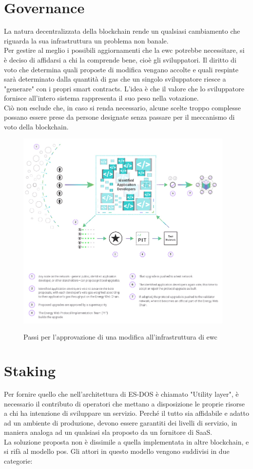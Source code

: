 \documentclass[12pt, letterpaper, twoside]{article}
\begin{document}
\newpage

\section{Governance}
La natura decentralizzata della blockchain rende un qualsiasi cambiamento che riguarda la sua infrastruttura un problema non banale. \\
Per gestire al meglio i possibili aggiornamenti che la \gls{ewc} potrebbe necessitare, si è deciso di affidarsi a chi la comprende bene, cioè gli sviluppatori.
Il diritto di voto che determina quali proposte di modifica vengano accolte e quali respinte sarà determinato dalla quantità di gas che un singolo sviluppatore riesce a "generare" con i propri smart contracts.
L'idea è che il valore che lo sviluppatore fornisce all'intero sistema rappresenta il suo peso nella votazione. \cite{wiki:ew-governance} \\
Ciò non esclude che, in caso si renda necessario, alcune scelte troppo complesse possano essere prese da persone designate senza passare per il meccanismo di voto della blockchain.

\begin{figure}[!h]
    \includegraphics[height=10cm,keepaspectratio]{ew-governance}
    \centering
    \label{ew-governance}
    \caption{Passi per l'approvazione di una modifica all'infrastruttura di \gls{ewc} \cite{img:ew-governance}}
\end{figure}

\newpage

\section{Staking}
Per fornire quello che nell'architettura di ES-DOS è chiamato "Utility layer", è necessario il contributo di operatori che mettano a disposizione le proprie risorse a chi ha intenzione di sviluppare un servizio.
Perché il tutto sia affidabile e adatto ad un ambiente di produzione, devono essere garantiti dei livelli di servizio, in maniera analoga ad un qualsiasi \gls{sla} proposto da un fornitore di SaaS. \\
La soluzione proposta non è dissimile a quella implementata in altre blockchain, e si rifà al modello \gls{pos}.
Gli attori in questo modello vengono suddivisi in due categorie:
\end{document}
